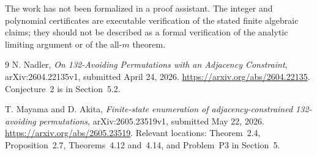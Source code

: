 \documentclass[11pt,a4paper]{article}
\theoremstyle{definition}\newaliascnt{definition}{theorem}
\theoremstyle{remark}\newaliascnt{remark}{theorem}
\begin{document}
The work has not been formalized in a proof assistant. The integer and
polynomial certificates are executable verification of the stated finite
algebraic claims; they should not be described as a formal verification
of the analytic limiting argument or of the all-$m$ theorem.

\begin{thebibliography}{9}
N. Nadler, \emph{On 132-Avoiding Permutations with an Adjacency Constraint},
arXiv:2604.22135v1, submitted April 24, 2026.
\url{https://arxiv.org/abs/2604.22135}.
Conjecture~2 is in Section~5.2.

T. Mayama and D. Akita, \emph{Finite-state enumeration of adjacency-constrained
132-avoiding permutations}, arXiv:2605.23519v1, submitted May 22, 2026.
\url{https://arxiv.org/abs/2605.23519}.
Relevant locations: Theorem~2.4, Proposition~2.7, Theorems~4.12 and~4.14,
and Problem~P3 in Section~5.
\end{thebibliography}
\end{document}
